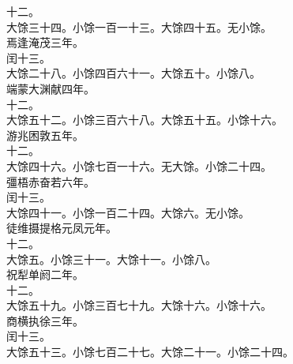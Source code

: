 \documentclass{zhvt-classic}
\begin{document}
\hspace*{2em}十二。\\
\hspace*{2em}大馀三十四。小馀一百一十三。大馀四十五。无小馀。\\
\hspace*{2em}焉逢淹茂三年。\\
\hspace*{2em}闰十三。\\
\hspace*{2em}大馀二十八。小馀四百六十一。大馀五十。小馀八。\\
\hspace*{2em}端蒙大渊献四年。\\
\hspace*{2em}十二。\\
\hspace*{2em}大馀五十二。小馀三百六十八。大馀五十五。小馀十六。\\
\hspace*{2em}游兆困敦五年。\\
\hspace*{2em}十二。\\
\hspace*{2em}大馀四十六。小馀七百一十六。无大馀。小馀二十四。\\
\hspace*{2em}彊梧赤奋若六年。\\
\hspace*{2em}闰十三。\\
\hspace*{2em}大馀四十一。小馀一百二十四。大馀六。无小馀。\\
\hspace*{2em}徒维摄提格元凤元年。\\
\hspace*{2em}十二。\\
\hspace*{2em}大馀五。小馀三十一。大馀十一。小馀八。\\
\hspace*{2em}祝犁单阏二年。\\
\hspace*{2em}十二。\\
\hspace*{2em}大馀五十九。小馀三百七十九。大馀十六。小馀十六。\\
\hspace*{2em}商横执徐三年。\\
\hspace*{2em}闰十三。\\
\hspace*{2em}大馀五十三。小馀七百二十七。大馀二十一。小馀二十四。\\
\end{document}
